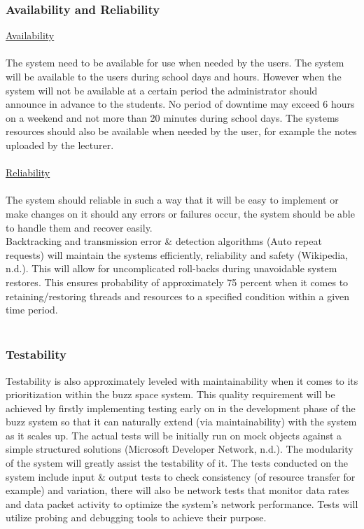 \subsubsection{Availability and Reliability}
\underline{Availability\\}
\\The system need to be available for use when needed by the users. The system will be available to the users during school days and hours. However when the system will not be available at a certain period the administrator should announce in advance to the students. No period of downtime may exceed 6 hours on a weekend and not more than 20 minutes during school days. The systems resources should also be available when needed by the user, for example the notes uploaded by the lecturer. \\
\\
\underline{Reliability\\}
\\The system should reliable in such a way that it will be easy to implement or make changes on it should any errors or failures occur, the system should be able to handle them and recover easily.\\
Backtracking and transmission error \& detection algorithms (Auto repeat requests) will maintain the systems efficiently, reliability and safety (Wikipedia, n.d.). This will allow for uncomplicated roll-backs during unavoidable system restores. This ensures probability of approximately 75 percent when it comes to retaining/restoring threads and resources to a specified condition within a given time period.\\
\\
\subsubsection{Testability}
Testability is also approximately leveled with maintainability when it comes to its prioritization within the buzz space system. This quality requirement will be achieved by firstly implementing testing early on in the development phase of the buzz system so that it can naturally extend (via maintainability) with the system as it scales up. The actual tests will be initially run on mock objects against a simple structured solutions (Microsoft Developer Network, n.d.). The modularity of the system will greatly assist the testability of it. The tests conducted on the system include input \& output tests to check consistency (of resource transfer for example) and variation, there will also be network tests that monitor data rates and data packet activity to optimize the system’s network performance. Tests will utilize probing and debugging tools to achieve their purpose.\\
\\



